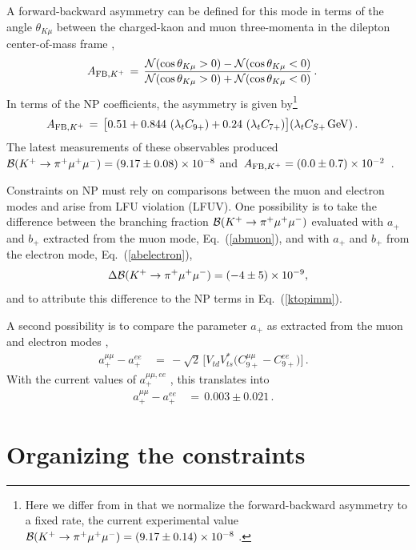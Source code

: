 \documentclass[amsmath,amssymb,aps,nofootinbib,prd,preprint,superscriptaddress,tightenlines,a4paper,bm]{revtex4-2}
\begin{document}
A forward-backward asymmetry  can be defined for this mode in terms of the angle $\theta_{K\mu}$ between the charged-kaon and muon three-momenta in the dilepton center-of-mass frame \cite{Chen:2003nz},
\begin{align}
    A_{{\rm FB},K^+} & \,=\, \frac{{\cal N}(\cos\theta_{K\mu}>0)-{\cal N}(\cos\theta_{K\mu}<0)}{{\cal N}(\cos\theta_{K\mu}>0)+{\cal N}(\cos\theta_{K\mu}<0)} \,. &
\end{align}
In terms of the NP coefficients, the asymmetry is  given by\footnote{Here we differ from \cite{Geng:2021fog} in that we normalize the forward-backward asymmetry to a fixed rate, the current experimental value \,${\cal B}(K^+\to\pi^+\mu^+\mu^-)=(9.17\pm 0.14)\times 10^{-8}$ \cite{Workman:2022ynf}.}
\begin{align}
A_{{\rm FB},K^+} & \,=\, \big[ 0.51 + 0.844~(\lambda_tC_{9+}) + 0.24~ (\lambda_tC_{7+}) \big](\lambda_tC_{S+\,}{\rm GeV}) \,. &
\end{align}
The latest measurements of these observables produced \,${\cal B}(K^+\to\pi^+\mu^+\mu^-)=(9.17\pm 0.08) \times10^{-8}$ and \,$A_{{\rm FB},K^+}=(0.0\pm 0.7)\times 10^{-2}$\, \cite{NA62:2022qes}.

Constraints on NP must rely on comparisons between the muon and electron modes and arise from LFU violation (LFUV).
One possibility  is to take the difference between the branching fraction ${\cal B}(K^+\to\pi^+\mu^+\mu^-)$ evaluated with  $a_+$ and $b_+$ extracted from the muon mode, Eq.~(\ref{abmuon}), and with  $a_+$ and $b_+$ from the electron mode, Eq.~(\ref{abelectron}),
\begin{align}
\Delta{\cal B}(K^+\to\pi^+\mu^+\mu^-)=(-4\pm5)\times 10^{-9},
\end{align}
and to attribute this difference to the NP terms in Eq.~(\ref{ktopimm}).

A second possibility is to compare the parameter $a_+$ as extracted from the muon and electron modes \cite{Crivellin:2016vjc,DAmbrosio:2022kvb},
\begin{align}\label{eq:K_LFUV}
a_+^{\mu\mu}-a_+^{ee} & \,=\, -\sqrt{2}\, \big[ V_{td}^{} V^*_{ts} \big(C^{\mu\mu}_{9+}-C^{ee}_{9+}\big) \big] \,. &
\end{align}
With the current values of $a_+^{\mu\mu,ee}$ \cite{NA482:2009pfe,NA62:2022qes},  this translates into
\begin{align}
a_+^{\mu\mu}-a_+^{ee} & \,=\, 0.003\pm 0.021 \,. &
\end{align}


\section{Organizing the constraints\label{constraints}}
\end{document}
